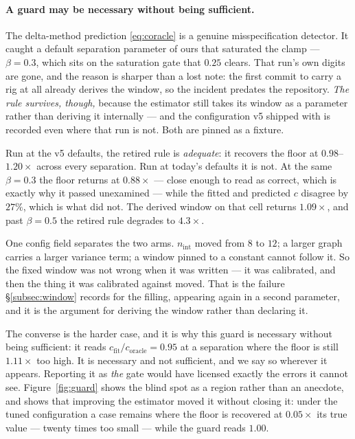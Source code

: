 \documentclass[11pt,a4paper]{article}
\begin{document}
\paragraph{A guard may be necessary without being sufficient.} The delta-method
prediction \eqref{eq:coracle} is a genuine misspecification detector. It caught a
default separation parameter of ours that saturated the clamp --- $\beta = 0.3$,
which sits on the saturation gate that $0.25$ clears. That run's own digits are
gone, and the reason is sharper than a lost note: the first commit to carry a rig
at all already derives the window, so the incident predates the repository.
\emph{The rule survives, though,} because the estimator still takes its window as
a parameter rather than deriving it internally --- and the configuration v5
shipped with is recorded even where that run is not. Both are pinned as a
fixture.

Run at the v5 defaults, the retired rule is \emph{adequate}: it recovers the
floor at $0.98$--$1.20\times$ across every separation. Run at today's defaults it
is not. At the same $\beta = 0.3$ the floor returns at $0.88\times$ --- close
enough to read as correct, which is exactly why it passed unexamined --- while
the fitted and predicted $c$ disagree by $27\%$, which is what did not. The
derived window on that cell returns $1.09\times$, and past $\beta = 0.5$ the
retired rule degrades to $4.3\times$.

One config field separates the two arms. $n_{\mathrm{int}}$ moved from $8$ to
$12$; a larger graph carries a larger variance term; a window pinned to a
constant cannot follow it. So the fixed window was not wrong when it was
written --- it was calibrated, and then the thing it was calibrated against
moved. That is the failure \S\ref{subsec:window} records for the filling,
appearing again in a second parameter, and it is the argument for deriving the
window rather than declaring it.

The converse is the harder case, and it is why this guard is necessary without
being sufficient: it reads $c_{\mathrm{fit}}/c_{\mathrm{oracle}} = 0.95$ at a
separation where the floor is still $1.11\times$ too high. It is necessary and not
sufficient, and we say so wherever it appears. Reporting it as \emph{the} gate
would have licensed exactly the errors it cannot see. Figure~\ref{fig:guard}
shows the blind spot as a region rather than an anecdote, and shows that
improving the estimator moved it without closing it: under the tuned
configuration a case remains where the floor is recovered at $0.05\times$ its
true value --- twenty times too small --- while the guard reads $1.00$.
\end{document}
